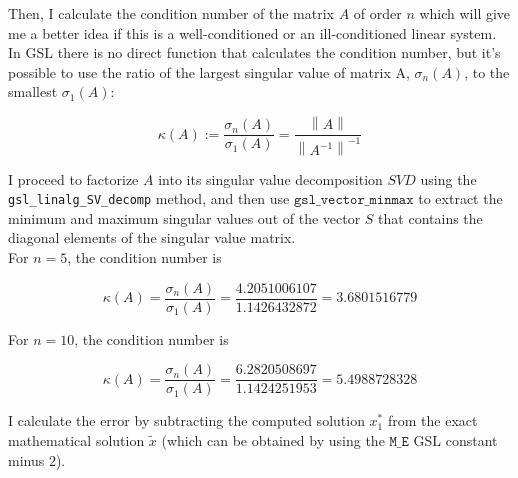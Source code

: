 \documentclass{article}
\newcommand{\code}{\texttt}
\newcommand{\norm}[1]{\left\lVert#1\right\rVert}
\begin{document}
Then, I calculate the condition number of the matrix $A$ of order $n$ which will give me a better idea if this is a well-conditioned or an ill-conditioned linear system. In GSL there is no direct function that calculates the condition number, but it's possible to use the ratio of the largest singular value of matrix A, $\sigma_n (A)$, to the smallest $\sigma_1 (A)$:

$$\kappa(A) := \frac{\sigma_n (A)}{\sigma_1 (A)}= \frac{\norm{A}}{\norm{A^{-1}}^{-1}}$$

I proceed to factorize $A$ into its singular value decomposition $SVD$ using the \code{gsl\_linalg\_SV\_decomp} method, and then use $\code{gsl\_vector\_minmax}$ to extract the minimum and maximum singular values out of the vector $S$ that contains the diagonal elements of the singular value matrix. \\

For $n=5$, the condition number is

$$\kappa(A) = \frac{\sigma_n (A)}{\sigma_1 (A)}= \frac{4.2051006107}{1.1426432872}=3.6801516779$$

For $n=10$, the condition number is

$$\kappa(A) = \frac{\sigma_n (A)}{\sigma_1 (A)}= \frac{6.2820508697}{1.1424251953}=5.4988728328$$

I calculate the error by subtracting the computed solution $x_{1}^{\ast}$ from the exact mathematical solution $\widetilde{x}$ (which can be obtained by using the $\code{M\_E}$ GSL constant minus 2).\\
\end{document}
